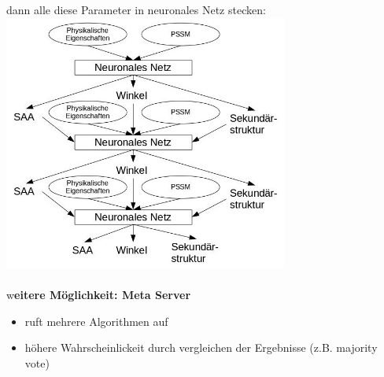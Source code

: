 dann alle diese Parameter in neuronales Netz stecken:\\
\includegraphics[width=0.7\textwidth]{lectures/160530/pix/neuro_net.jpg}
\\\\
w\textbf{eitere Möglichkeit: Meta Server}\\
\begin{itemize}
	\item ruft mehrere Algorithmen auf
	\item höhere Wahrscheinlickeit durch vergleichen der Ergebnisse (z.B. majority vote)
\end{itemize}